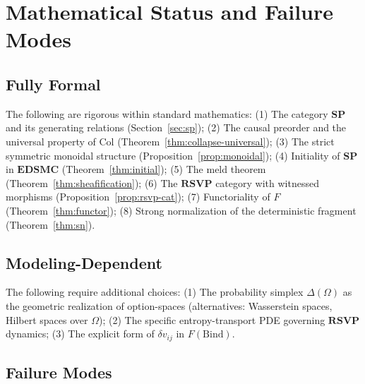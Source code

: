 \documentclass[12pt,a4paper]{article}
\theoremstyle{definition}
\theoremstyle{remark}
\newcommand{\SP}{\mathbf{SP}}
\newcommand{\RSVP}{\mathbf{RSVP}}
\newcommand{\EDSMC}{\mathbf{EDSMC}}
\newcommand{\Bind}{\ensuremath{\mathrm{Bind}}}
\newcommand{\Col}{\ensuremath{\mathrm{Col}}}
\newcommand{\vF}{v}
\begin{document}
\section{Mathematical Status and Failure Modes}
\label{sec:status}

\subsection{Fully Formal}

The following are rigorous within standard mathematics:
(1) The category $\SP$ and its generating relations (Section~\ref{sec:sp});
(2) The causal preorder and the universal property of $\Col$ (Theorem~\ref{thm:collapse-universal});
(3) The strict symmetric monoidal structure (Proposition~\ref{prop:monoidal});
(4) Initiality of $\SP$ in $\EDSMC$ (Theorem~\ref{thm:initial});
(5) The meld theorem (Theorem~\ref{thm:sheafification});
(6) The $\RSVP$ category with witnessed morphisms (Proposition~\ref{prop:rsvp-cat});
(7) Functoriality of $F$ (Theorem~\ref{thm:functor});
(8) Strong normalization of the deterministic fragment (Theorem~\ref{thm:sn}).

\subsection{Modeling-Dependent}

The following require additional choices:
(1) The probability simplex $\Delta(\Omega)$ as the geometric realization of option-spaces
(alternatives: Wasserstein spaces, Hilbert spaces over $\Omega$);
(2) The specific entropy-transport PDE governing $\RSVP$ dynamics;
(3) The explicit form of $\delta\vF_{ij}$ in $F(\Bind)$.

\subsection{Failure Modes}
\end{document}
